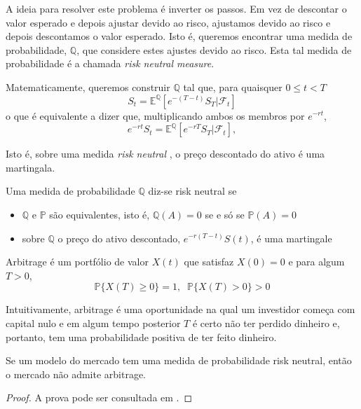 \documentclass{article}
\begin{document}
\vspace{0.25cm}

A ideia para resolver este problema é inverter os passos. Em vez de descontar o valor esperado e depois ajustar devido ao risco, ajustamos devido ao risco e depois descontamos o valor esperado. Isto é, queremos encontrar uma medida de probabilidade, $\mathbb{Q}$, que considere estes ajustes devido ao risco. Esta tal medida de probabilidade é a chamada \textit{risk neutral measure}.

\vspace{0.25cm}


Matematicamente, queremos construir $\mathbb{Q}$ tal que, para quaisquer $0 \leq t <T$
$$S_t=\mathbb{E^Q}[e^{-(T-t)}S_T|\mathcal{F}_t]$$
o que é equivalente a dizer que, multiplicando ambos os membros por $e^{-rt}$,
$$e^{-rt}S_t=\mathbb{E^Q}[e^{-rT}S_T |\mathcal{F}_t],$$

\vspace{0.25cm}

Isto é, sobre uma medida \textit{risk neutral }, o preço descontado do ativo é uma martingala.

\vspace{0.2cm}

\begin{dfn}
    Uma medida de probabilidade $\mathbb{Q}$ diz-se risk neutral se
    \begin{itemize}
        \item $\mathbb{Q}$ e $\mathbb{P}$ são equivalentes, isto é, $\mathbb{Q}(A)=0$ se e só se $\mathbb{P}(A)=0$
        \item sobre $\mathbb{Q}$ o preço do ativo descontado, $e^{-r(T-t)}S(t)$, é uma martingale
    \end{itemize}
\end{dfn}

\vspace{0.2cm}

\begin{dfn}
    Arbitrage é um portfólio de valor $X(t)$ que satisfaz $X(0)=0$ e para algum $T >0$,
    $$\mathbb{P}\{X(T) \geq 0\}=1, \;\; \mathbb{P}\{ X(T)>0 \}>0$$
\end{dfn}

Intuitivamente, arbitrage é uma oportunidade na qual um investidor começa com capital nulo e em algum tempo posterior $ T$ é certo não ter perdido dinheiro e, portanto, tem uma probabilidade positiva de ter feito dinheiro.


\begin{thm} Se um modelo do mercado tem uma medida de probabilidade risk neutral, então o mercado não admite arbitrage.
\end{thm}
\begin{proof}
A prova pode ser consultada em \cite{Shreve2004}.
\end{proof}
\end{document}
